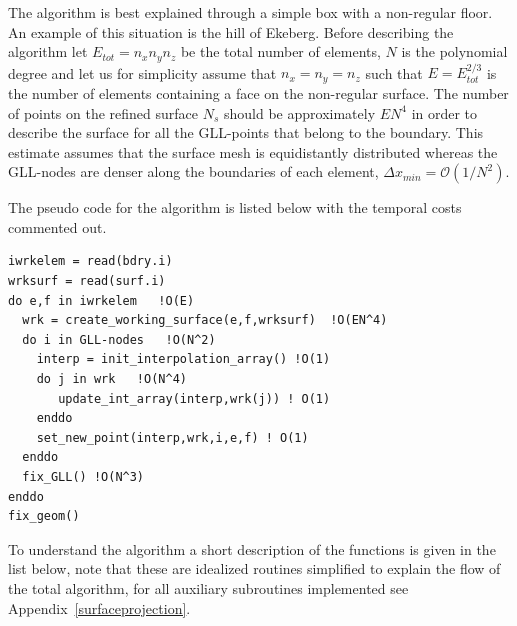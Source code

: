 The algorithm is best explained through a simple box with a non-regular floor. 
An example of this situation is the hill of Ekeberg. 
Before describing the algorithm let $E_{tot} = n_xn_yn_z$  be the total number of elements, 
$N$ is the polynomial degree and let us for simplicity assume that $n_x=n_y=n_z$ such that 
$E= E_{tot}^{2/3}$ is the number of elements containing a face on the non-regular surface.
The number of points on the refined surface $N_s$ should be approximately $EN^4$ in 
order to describe the surface for all the GLL-points that belong to the boundary. This estimate
assumes that the surface mesh is equidistantly distributed whereas the GLL-nodes 
are denser along the boundaries of each element, $\Delta x_{min} = \mathcal{O}(1/N^2)$. 

\newpage
The pseudo code for the algorithm is listed below with the temporal costs commented out.
%
\begingroup
\fontsize{12pt}{14pt}
\begin{lstlisting}[escapechar=|,frame=none]
iwrkelem = read(bdry.i)
wrksurf = read(surf.i)
do e,f in iwrkelem   !O(E)
  wrk = create_working_surface(e,f,wrksurf)  !O(EN^4) 
  do i in GLL-nodes   !O(N^2)
    interp = init_interpolation_array() !O(1) 
    do j in wrk   !O(N^4)
       update_int_array(interp,wrk(j)) ! O(1)
    enddo
    set_new_point(interp,wrk,i,e,f) ! O(1)
  enddo
  fix_GLL() !O(N^3)
enddo
fix_geom()
\end{lstlisting}
\endgroup
% 
To understand the algorithm a short description of the functions is 
given in the list below, note that these are idealized routines simplified to 
explain the flow of the total algorithm, for all auxiliary subroutines implemented see Appendix~\ref{surfaceprojection}.

